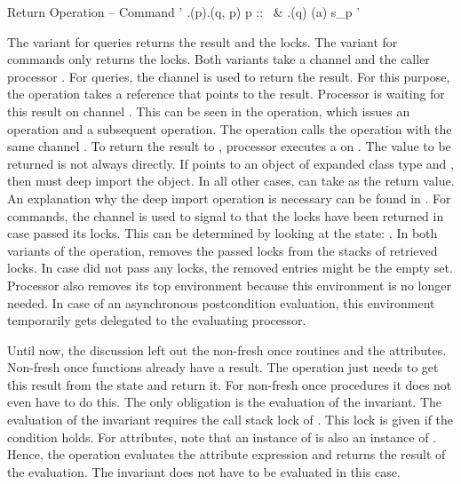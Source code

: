 \inferencerule
	{Return Operation -- Command}
	{\state' \mathematicaldefinition \state.\popenvironmentfeature(p).\revokelocksfeature(q, p)}
	{}
	{
		\configuration
			{
				p :: \ & \singlelineconditionaloperation
					{\state.\arelockspassedfeature(q)}
					{\notifyoperation(a)}
					{\nooperation} \statementseparator
				s_{p}
			}
			{\state'}
	}
 
The variant for queries returns the result and the locks. The variant for commands only returns the locks. Both variants take a channel  and the caller processor . For queries, the channel is used to return the result. For this purpose, the operation takes a reference  that points to the result. Processor  is waiting for this result on channel . This can be seen in the  operation, which issues an  operation and a subsequent  operation. The  operation calls the  operation with the same channel . To return the result to , processor  executes a  on . The value to be returned is not always  directly. If  points to an object of expanded class type and , then  must deep import the object. In all other cases,  can take  as the return value. An explanation why the deep import operation is necessary can be found in . For commands, the channel is used to signal to  that the locks have been returned in case  passed its locks. This can be determined by looking at the state: . In both variants of the  operation,  removes the passed locks from the stacks of retrieved locks. In case  did not pass any locks, the removed entries might be the empty set. Processor  also removes its top environment because this environment is no longer needed. In case of an asynchronous postcondition evaluation, this environment temporarily gets delegated to the evaluating processor.

Until now, the discussion left out the non-fresh once routines and the attributes. Non-fresh once functions already have a result. The  operation just needs to get this result from the state and return it. For non-fresh once procedures it does not even have to do this. The only obligation is the evaluation of the invariant. The evaluation of the invariant requires the call stack lock of . This lock is given if the condition  holds. For attributes, note that an instance of  is also an instance of . Hence, the operation evaluates the attribute expression and returns the result of the evaluation. The invariant does not have to be evaluated in this case.


